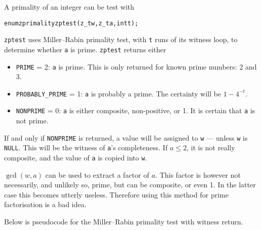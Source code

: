 A primality of an integer can be test with

\begin{alltt}
   enum zprimality zptest(z_t w, z_t a, int t);
\end{alltt}

\noindent
{\tt zptest} uses Miller–Rabin primality test,
with {\tt t} runs of its witness loop, to
determine whether {\tt a} is prime. {\tt zptest}
returns either

\begin{itemize}
\item {\tt PRIME} = 2:
{\tt a} is prime. This is only returned for
known prime numbers: 2 and 3.

\item {\tt PROBABLY\_PRIME} = 1:
{\tt a} is probably a prime. The certainty
will be $1 - 4^{-t}$.

\item {\tt NONPRIME} = 0:
{\tt a} is either composite, non-positive, or 1.
It is certain that {\tt a} is not prime.
\end{itemize}

If and only if {\tt NONPRIME} is returned, a
value will be assigned to {\tt w} — unless
{\tt w} is {\tt NULL}. This will be the witness
of {\tt a}'s completeness. If $a \le 2$, it
is not really composite, and the value of
{\tt a} is copied into {\tt w}.

$\gcd(w, a)$ can be used to extract a factor
of $a$. This factor is however not necessarily,
and unlikely so, prime, but can be composite,
or even 1. In the latter case this becomes
utterly useless. Therefore using this method
for prime factorisation is a bad idea.

Below is pseudocode for the Miller–Rabin primality
test with witness return.

